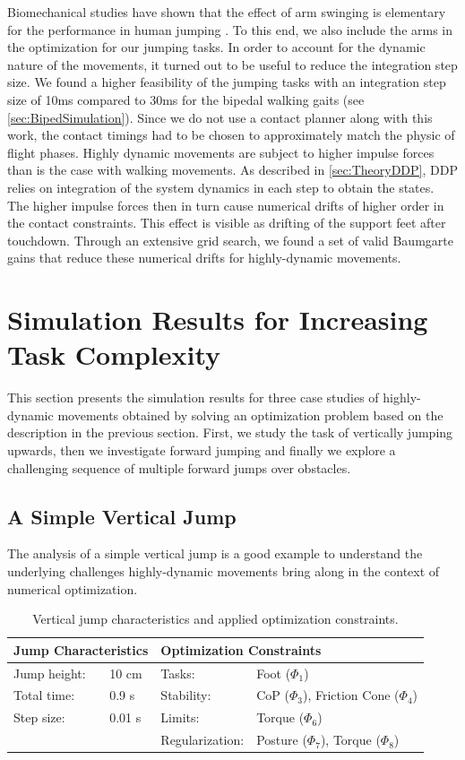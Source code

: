 Biomechanical studies have shown that the effect of arm swinging is elementary for the performance in human jumping \cite{harman1990effects}. To this end, we also include the arms in the optimization for our jumping tasks. 
In order to account for the dynamic nature of the movements, it turned out to be useful to reduce the integration step size. We found a higher feasibility of the jumping tasks with an integration step size of 10ms compared to 30ms for the bipedal walking gaits (see \cref{sec:BipedSimulation}). Since we do not use a contact planner along with this work, the contact timings had to be chosen to approximately match the physic of flight phases. 
Highly dynamic movements are subject to higher impulse forces than is the case with walking movements. As described in \ref{sec:TheoryDDP}, \gls{DDP} relies on integration of the system dynamics in each step to obtain the states. The higher impulse forces then in turn cause numerical drifts of higher order in the contact constraints. This effect is visible as drifting of the support feet after touchdown. Through an extensive grid search, we found a set of valid Baumgarte gains that reduce these numerical drifts for highly-dynamic movements.

\section{Simulation Results for Increasing Task Complexity}\label{sec:HighlySimulation}
This section presents the simulation results for three case studies of highly-dynamic movements obtained by solving an optimization problem based on the description in the previous section. First, we study the task of vertically jumping upwards, then we investigate forward jumping and finally we explore a challenging sequence of multiple forward jumps over obstacles.

\subsection{A Simple Vertical Jump}
The analysis of a simple vertical jump is a good example to understand the underlying challenges highly-dynamic movements bring along in the context of numerical optimization.

\begin{table}[t]
\centering
\caption{Vertical jump characteristics and applied optimization constraints.}
\begin{tabular}{|ll|ll|}
\hline
\multicolumn{2}{|l|}{\textbf{Jump Characteristics}} & \multicolumn{2}{l|}{\textbf{Optimization Constraints}} \\ \hline
Jump height:& 10 cm 	& Tasks: 			& Foot ($\Phi_1$) \\ \hline
Total time:& 0.9 s 		& Stability:    & \gls{CoP} ($\Phi_3$), Friction Cone ($\Phi_4$)\\ \hline
Step size:& 0.01 s 	& Limits: 			& Torque ($\Phi_6$)\\ \hline
& 					& Regularization: 	& Posture ($\Phi_7$), Torque ($\Phi_8$)\\ \hline
\end{tabular}
\label{tab:jumpVertical}
\end{table}

